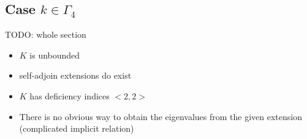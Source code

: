 \subsection{Case $k\in\Gamma_4$}
\label{sec:case-kingamma_4}

TODO: whole section\\

\begin{itemize}
\item $K$ is unbounded
\item self-adjoin extensions do exist
\item $K$ has deficiency indices $<2,2>$
\item There is no obvious way to obtain the eigenvalues from the given
  extension (complicated implicit relation)
\end{itemize}

